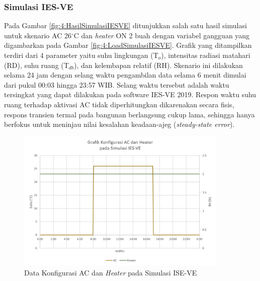 \subsubsection{Simulasi IES-VE}

Pada Gambar \ref{fig:4:HasilSimulasiIESVE} ditunjukkan salah satu hasil simulasi untuk skenario AC 26$^\circ$C dan \textit{heater} ON 2 buah dengan variabel gangguan yang digambarkan pada Gambar \ref{fig:4:LoadSimulasiIESVE}. Grafik yang ditampilkan terdiri dari 4 parameter yaitu suhu lingkungan (T$_o$), intensitas radiasi matahari (RD), suhu ruang (T$_{db}$), dan kelembapan relatif (RH). Skenario ini dilakukan selama 24 jam dengan selang waktu pengambilan data selama 6 menit dimulai dari pukul 00:03 hingga 23:57 WIB. Selang waktu tersebut adalah waktu tersingkat yang dapat dilakukan pada software IES-VE 2019. Respon waktu suhu ruang terhadap aktivasi AC tidak diperhitungkan dikarenakan secara fisis, respons transien termal pada bangunan berlangsung cukup lama, sehingga hanya berfokus untuk meninjau nilai kesalahan keadaan-ajeg (\textit{steady-state error}).

\begin{figure}[!h]
	\centering
	\includegraphics[width=0.9\textwidth]{figures/ACHTSimulasiIESVE}
	\caption{Data Konfigurasi AC dan \textit{Heater} pada Simulasi ISE-VE}
	\label{fig:4:ACHTSimulasiIESVE}
\end{figure}
\vspace{1em}

